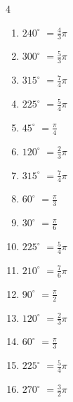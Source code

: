 \begin{multicols}{4}
\begin{enumerate}
  \item $\displaystyle 240^{\circ}$
        $\displaystyle =\frac{4}{3}\pi$

  \item $\displaystyle 300^{\circ}$
        $\displaystyle =\frac{5}{3}\pi$

  \item $\displaystyle 315^{\circ}$
        $\displaystyle =\frac{7}{4}\pi$

  \item $\displaystyle 225^{\circ}$
        $\displaystyle =\frac{5}{4}\pi$

  \item $\displaystyle 45^{\circ}$
        $\displaystyle =\frac{\pi}{4}$

  \item $\displaystyle 120^{\circ}$
        $\displaystyle =\frac{2}{3}\pi$

  \item $\displaystyle 315^{\circ}$
        $\displaystyle =\frac{7}{4}\pi$

  \item $\displaystyle 60^{\circ}$
        $\displaystyle =\frac{\pi}{3}$

  \item $\displaystyle 30^{\circ}$
        $\displaystyle =\frac{\pi}{6}$

  \item $\displaystyle 225^{\circ}$
        $\displaystyle =\frac{5}{4}\pi$

  \item $\displaystyle 210^{\circ}$
        $\displaystyle =\frac{7}{6}\pi$

  \item $\displaystyle 90^{\circ}$
        $\displaystyle =\frac{\pi}{2}$

  \item $\displaystyle 120^{\circ}$
        $\displaystyle =\frac{2}{3}\pi$

  \item $\displaystyle 60^{\circ}$
        $\displaystyle =\frac{\pi}{3}$

  \item $\displaystyle 225^{\circ}$
        $\displaystyle =\frac{5}{4}\pi$

  \item $\displaystyle 270^{\circ}$
        $\displaystyle =\frac{3}{2}\pi$

\columnbreak %

\resetques


\end{enumerate}
\end{multicols}
